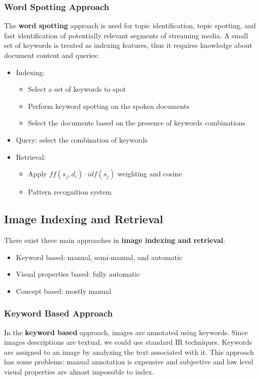 \documentclass{article}
\begin{document}
\subsubsection{Word Spotting Approach}
The \textbf{word spotting} approach is used for topic identification, topic spotting, and fast identification of potentially relevant segments of
streaming media. A small set of keywords is treated as indexing features, thus it requires knowledge about document content and queries:
\begin{itemize}
    \item Indexing:
        \begin{itemize}
            \item Select a set of keywords to spot
            \item Perform keyword spotting on the spoken documents
            \item Select the documents based on the presence of keywords combinations
        \end{itemize}
    \item Query: select the combination of keywords
    \item Retrieval:
        \begin{itemize}
            \item Apply $ff(s_j,d_i) \cdot idf(s_j)$ weighting and cosine 
            \item Pattern recognition system
        \end{itemize}
\end{itemize}

\subsection{Image Indexing and Retrieval}
There exist three main approaches in \textbf{image indexing and retrieval}:
\begin{itemize}
    \item Keyword based: manual, semi-manual, and automatic
    \item Visual properties based: fully automatic
    \item Concept based: mostly manual
\end{itemize}

\subsubsection{Keyword Based Approach}
In the \textbf{keyword based} approach, images are annotated using keywords. Since images descriptions are textual, we could use standard IR techniques. Keywords are assigned to an image by analyzing the text associated with it. This approach has some problems: manual annotation is expensive and subjective and low level visual properties are almost impossible to index.
\end{document}
